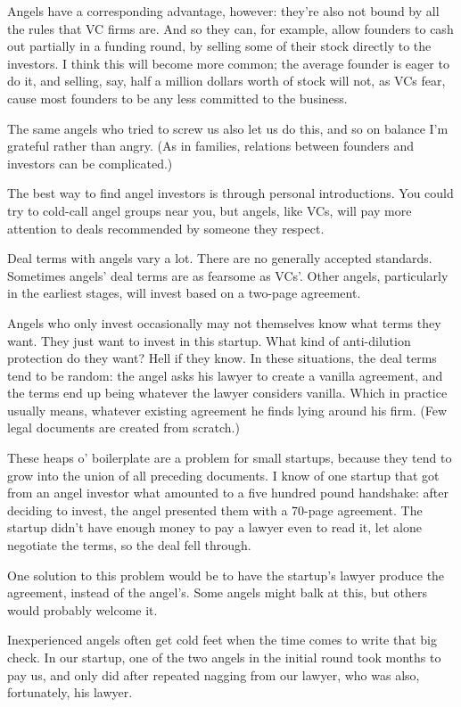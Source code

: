 Angels have a corresponding advantage, however: they're also not bound
by all the rules that VC firms are. And so they can, for example, allow
founders to cash out partially in a funding round, by selling some of
their stock directly to the investors. I think this will become more
common; the average founder is eager to do it, and selling, say, half a
million dollars worth of stock will not, as VCs fear, cause most
founders to be any less committed to the business.

The same angels who tried to screw us also let us do this, and so on
balance I'm grateful rather than angry. (As in families, relations
between founders and investors can be complicated.)

The best way to find angel investors is through personal introductions.
You could try to cold-call angel groups near you, but angels, like VCs,
will pay more attention to deals recommended by someone they respect.

Deal terms with angels vary a lot. There are no generally accepted
standards. Sometimes angels' deal terms are as fearsome as VCs'. Other
angels, particularly in the earliest stages, will invest based on a
two-page agreement.

Angels who only invest occasionally may not themselves know what terms
they want. They just want to invest in this startup. What kind of
anti-dilution protection do they want? Hell if they know. In these
situations, the deal terms tend to be random: the angel asks his lawyer
to create a vanilla agreement, and the terms end up being whatever the
lawyer considers vanilla. Which in practice usually means, whatever
existing agreement he finds lying around his firm. (Few legal documents
are created from scratch.)

These heaps o' boilerplate are a problem for small startups, because
they tend to grow into the union of all preceding documents. I know of
one startup that got from an angel investor what amounted to a five
hundred pound handshake: after deciding to invest, the angel presented
them with a 70-page agreement. The startup didn't have enough money to
pay a lawyer even to read it, let alone negotiate the terms, so the deal
fell through.

One solution to this problem would be to have the startup's lawyer
produce the agreement, instead of the angel's. Some angels might balk at
this, but others would probably welcome it.

Inexperienced angels often get cold feet when the time comes to write
that big check. In our startup, one of the two angels in the initial
round took months to pay us, and only did after repeated nagging from
our lawyer, who was also, fortunately, his lawyer.

